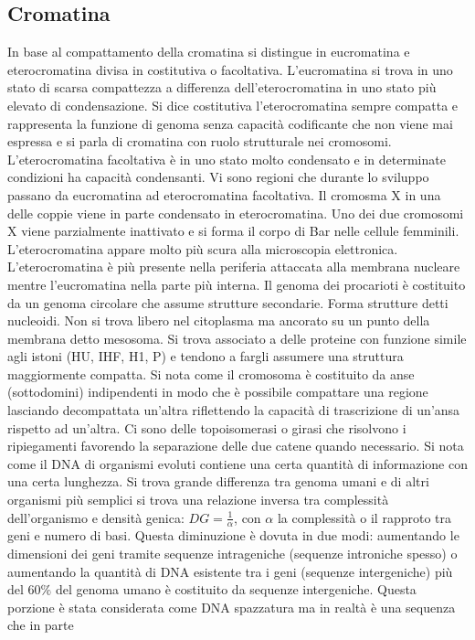 \subsection{Cromatina}
In base al compattamento della cromatina si distingue in eucromatina e eterocromatina divisa in costitutiva o facoltativa. L'eucromatina si trova in uno stato di scarsa compattezza a 
differenza dell'eterocromatina in uno stato pi\`u elevato di condensazione. Si dice costitutiva l'eterocromatina sempre compatta e rappresenta la funzione di genoma senza capacit\`a
codificante che non viene mai espressa e si parla di cromatina con ruolo strutturale nei cromosomi. L'eterocromatina facoltativa \`e in uno stato molto condensato e in determinate 
condizioni ha capacit\`a condensanti. Vi sono regioni che durante lo sviluppo passano da eucromatina ad eterocromatina facoltativa. Il cromosma X in una delle coppie viene in parte 
condensato in eterocromatina. Uno dei due cromosomi X viene parzialmente inattivato e si forma il corpo di Bar nelle cellule femminili. L'eterocromatina appare molto pi\`u scura alla
microscopia elettronica. L'eterocromatina \`e pi\`u presente nella periferia attaccata alla membrana nucleare mentre l'eucromatina nella parte pi\`u interna. Il genoma dei procarioti
\`e costituito da un genoma circolare che assume strutture secondarie. Forma strutture detti nucleoidi. Non si trova libero nel citoplasma ma ancorato su un punto della membrana detto
mesosoma. Si trova associato a delle proteine con funzione simile agli istoni (HU, IHF, H1, P) e tendono a fargli assumere una struttura maggiormente compatta. Si nota come il cromosoma
\`e costituito da anse (sottodomini) indipendenti in modo che \`e possibile compattare una regione lasciando decompattata un'altra riflettendo la capacit\`a di trascrizione di un'ansa
rispetto ad un'altra. Ci sono delle topoisomerasi o girasi che risolvono i ripiegamenti favorendo la separazione delle due catene quando necessario. Si nota come il DNA di organismi 
evoluti contiene una certa quantit\`a di informazione con una certa lunghezza. Si trova grande differenza tra genoma umani e di altri organismi pi\`u semplici si trova una relazione
inversa tra complessit\`a dell'organismo e densit\`a genica: $DG = \frac{1}{\alpha}$, con $\alpha$ la complessit\`a o il rapproto tra geni e numero di basi. Questa diminuzione \`e dovuta
in due modi: aumentando le dimensioni dei geni tramite sequenze intrageniche (sequenze introniche spesso) o aumentando la quantit\`a di DNA esistente tra i geni (sequenze intergeniche) 
pi\`u  del $60\%$ del genoma umano \`e costituito da sequenze intergeniche. Questa porzione \`e stata considerata come DNA spazzatura ma in realt\`a \`e una sequenza che in parte 
